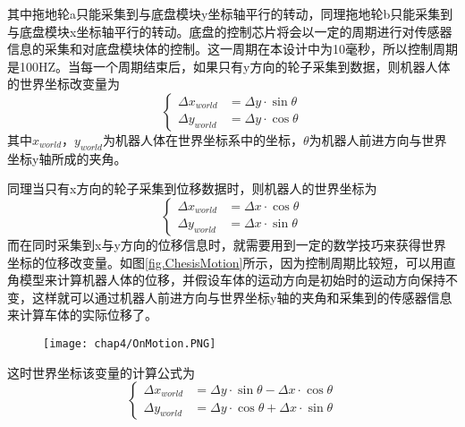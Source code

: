 其中拖地轮a只能采集到与底盘模块y坐标轴平行的转动，同理拖地轮b只能采集到与底盘模块x坐标轴平行的转动。底盘的控制芯片将会以一定的周期进行对传感器信息的采集和对底盘模块体的控制。这一周期在本设计中为10毫秒，所以控制周期是100HZ。当每一个周期结束后，如果只有y方向的轮子采集到数据，则机器人体的世界坐标改变量为 \\
\begin{equation}
		\left\{
             \begin{array}{lcl}
            	\Delta x_{world} &= \Delta y\cdot \sin\theta \\
             	\Delta y_{world} &= \Delta y\cdot \cos\theta  
             \end{array}  
        \right.
\end{equation}
其中$x_{world}$，$y_{world}$为机器人体在世界坐标系中的坐标，$\theta$为机器人前进方向与世界坐标y轴所成的夹角。

同理当只有x方向的轮子采集到位移数据时，则机器人的世界坐标为 \\
\begin{equation}
		\left\{
             \begin{array}{lcl}
            	\Delta x_{world} &= \Delta x\cdot \cos\theta \\
             	\Delta y_{world} &= \Delta x\cdot \sin\theta  
             \end{array}  
        \right.
\end{equation}
而在同时采集到x与y方向的位移信息时，就需要用到一定的数学技巧来获得世界坐标的位移改变量。如图\ref{fig.ChesisMotion}所示，因为控制周期比较短，可以用直角模型来计算机器人体的位移，并假设车体的运动方向是初始时的运动方向保持不变，这样就可以通过机器人前进方向与世界坐标y轴的夹角和采集到的传感器信息来计算车体的实际位移了。
\begin{figure}[!htp]
  \centering
  \texttt{[image: chap4/OnMotion.PNG]}
\end{figure}

这时世界坐标该变量的计算公式为 \\
\begin{equation}
		\left\{
             \begin{array}{lcl}
            	\Delta x_{world} &= \Delta y\cdot \sin\theta - \Delta x\cdot \cos\theta \\
             	\Delta y_{world} &= \Delta y\cdot \cos\theta + \Delta x\cdot \sin\theta  
             \end{array}  
        \right.
\end{equation}
